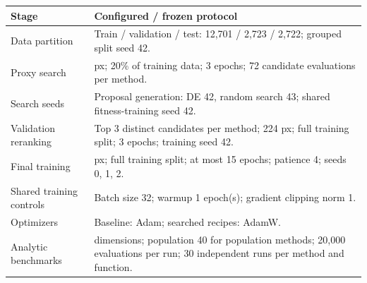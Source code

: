 \begin{tabular}{@{}>{\raggedright\arraybackslash}p{}>{\raggedright\arraybackslash}p{}@{}}
\toprule
Stage & Configured / frozen protocol \\
\midrule
Data partition & Train / validation / test: 12,701 / 2,723 / 2,722; grouped split seed 42. \\
Proxy search & 128 px; 20\% of training data; 3 epochs; 72 candidate evaluations per method. \\
Search seeds & Proposal generation: DE 42, random search 43; shared fitness-training seed 42. \\
Validation reranking & Top 3 distinct candidates per method; 224 px; full training split; 3 epochs; training seed 42. \\
Final training & 224 px; full training split; at most 15 epochs; patience 4; seeds 0, 1, 2. \\
Shared training controls & Batch size 32; warmup 1 epoch(s); gradient clipping norm 1. \\
Optimizers & Baseline: Adam; searched recipes: AdamW. \\
Analytic benchmarks & 10 dimensions; population 40 for population methods; 20,000 evaluations per run; 30 independent runs per method and function. \\
\bottomrule
\end{tabular}
